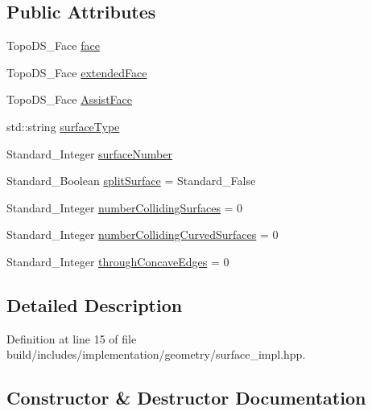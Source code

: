 \subsection*{Public Attributes}
\begin{DoxyCompactItemize}
\item 
Topo\+D\+S\+\_\+\+Face \hyperlink{classMcCAD_1_1Geometry_1_1Surface_1_1Impl_abf7c4dc859404ce42b425c7d6b578f69}{face}
\item 
Topo\+D\+S\+\_\+\+Face \hyperlink{classMcCAD_1_1Geometry_1_1Surface_1_1Impl_afaca81a1a3f54b93988737ac7085a0f2}{extended\+Face}
\item 
Topo\+D\+S\+\_\+\+Face \hyperlink{classMcCAD_1_1Geometry_1_1Surface_1_1Impl_aea34d548cf117c767c27247dfb8da345}{Assist\+Face}
\item 
std\+::string \hyperlink{classMcCAD_1_1Geometry_1_1Surface_1_1Impl_a884eb5e53b41a07ccf225b4addb670c3}{surface\+Type}
\item 
Standard\+\_\+\+Integer \hyperlink{classMcCAD_1_1Geometry_1_1Surface_1_1Impl_a0bc3cc1ff99f5700b84976fcbbcc877f}{surface\+Number}
\item 
Standard\+\_\+\+Boolean \hyperlink{classMcCAD_1_1Geometry_1_1Surface_1_1Impl_ae91b9cb7dc5d3510d556706ef94b17a8}{split\+Surface} = Standard\+\_\+\+False
\item 
Standard\+\_\+\+Integer \hyperlink{classMcCAD_1_1Geometry_1_1Surface_1_1Impl_a2ef1b754248098a8a4530ccd484b6e05}{number\+Colliding\+Surfaces} = 0
\item 
Standard\+\_\+\+Integer \hyperlink{classMcCAD_1_1Geometry_1_1Surface_1_1Impl_adb23f3b121284586302940d9ae0c1b3d}{number\+Colliding\+Curved\+Surfaces} = 0
\item 
Standard\+\_\+\+Integer \hyperlink{classMcCAD_1_1Geometry_1_1Surface_1_1Impl_ab1f136a1e90ff9215c1f229070c8b9b7}{through\+Concave\+Edges} = 0
\end{DoxyCompactItemize}


\subsection{Detailed Description}


Definition at line 15 of file build/includes/implementation/geometry/surface\+\_\+impl.\+hpp.



\subsection{Constructor \& Destructor Documentation}
\mbox{\label{classMcCAD_1_1Geometry_1_1Surface_1_1Impl_ae1bfecf4b3158933b37d4f4df24133ab}} 
